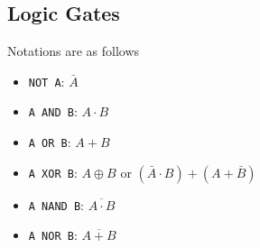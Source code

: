 \subsection{Logic Gates}

Notations are as follows
\begin{itemize}
    \item \texttt{NOT A}: $\bar{A}$
    \item \texttt{A AND B}: $A\cdot B$
    \item \texttt{A OR B}: $A+B$
    \item \texttt{A XOR B}: $A\oplus B$ or $(\bar{A}\cdot B)+(A+\bar{B})$
    \item \texttt{A NAND B}: $\overline{A\cdot B}$
    \item \texttt{A NOR B}: $\overline{A+B}$
\end{itemize}

